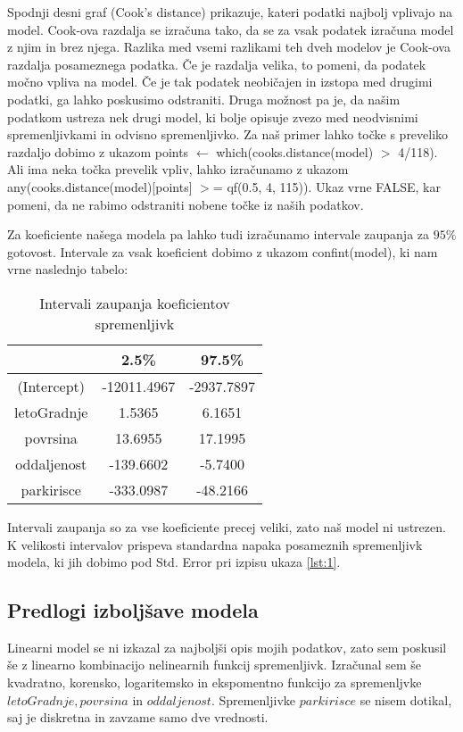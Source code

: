 \documentclass[a4paper, 12pt]{article}
\begin{document}
Spodnji desni graf (Cook's distance) prikazuje, kateri podatki najbolj
vplivajo na model. Cook-ova razdalja se izračuna tako, da se za vsak podatek
izračuna model z njim in brez njega. Razlika med vsemi razlikami teh dveh
modelov je Cook-ova razdalja posameznega podatka. Če je razdalja velika,
to pomeni, da podatek močno vpliva na model. Če je tak podatek neobičajen in
izstopa med drugimi podatki, ga lahko poskusimo odstraniti. Druga možnost pa
je, da našim podatkom ustreza nek drugi model, ki bolje opisuje zvezo med
neodvisnimi spremenljivkami in odvisno spremenljivko. Za naš primer lahko točke
s preveliko razdaljo dobimo z ukazom {\sf points $\leftarrow$ which(cooks.distance(model) $ > $ 4/118)}.
Ali ima neka točka prevelik vpliv, lahko izračunamo z ukazom
{\sf any(cooks.distance(model)[points] $ > $= qf(0.5, 4, 115))}. Ukaz vrne FALSE,
kar pomeni, da ne rabimo odstraniti nobene točke iz naših podatkov.

Za koeficiente našega modela pa lahko tudi izračunamo intervale zaupanja za
$ 95\% $ gotovost. Intervale za vsak koeficient dobimo z ukazom {\sf confint(model)}, ki
nam vrne naslednjo tabelo:
\begin{table}[H]
\begin{center}
\caption{Intervali zaupanja koeficientov spremenljivk}
\begin{tabular}{ c|cc }
	& 2.5\% & 97.5\% \\
	\hline
	(Intercept) & -12011.4967 & -2937.7897 \\
	letoGradnje & 1.5365 & 6.1651 \\
	povrsina & 13.6955 & 17.1995 \\
	oddaljenost & -139.6602 & -5.7400 \\
	parkirisce & -333.0987 & -48.2166 \\
\end{tabular}
\end{center}
\end{table}
Intervali zaupanja so za vse koeficiente precej veliki, zato naš model ni
ustrezen. K velikosti intervalov prispeva standardna napaka posameznih
spremenljivk modela, ki jih dobimo pod {\sf Std. Error} pri izpisu ukaza
\ref{lst:1}.

\subsection{Predlogi izboljšave modela}

Linearni model se ni izkazal za najboljši opis mojih podatkov, zato sem
poskusil še z linearno kombinacijo nelinearnih funkcij spremenljivk.
Izračunal sem še kvadratno, korensko, logaritemsko in ekspomentno funkcijo
za spremenljvke $ letoGradnje, povrsina $ in $ oddaljenost $. Spremenljivke
$ parkirisce $ se nisem dotikal, saj je diskretna in zavzame samo dve
vrednosti.
\end{document}
